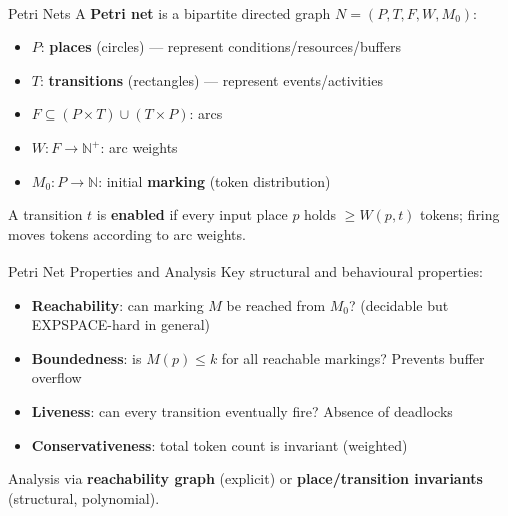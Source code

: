 \begin{v3topic}{Petri Nets}
    A \textbf{Petri net} is a bipartite directed graph $N = (P, T, F, W, M_0)$\textsuperscript{\cite[][pp.~1--30]{reisigUnderstandingPetriNets2013}}:
    \begin{itemize}
        \item $P$: \textbf{places} (circles) — represent conditions/resources/buffers
        \item $T$: \textbf{transitions} (rectangles) — represent events/activities
        \item $F \subseteq (P \times T) \cup (T \times P)$: arcs
        \item $W: F \to \mathbb{N}^+$: arc weights
        \item $M_0: P \to \mathbb{N}$: initial \textbf{marking} (token distribution)
    \end{itemize}
    A transition $t$ is \textbf{enabled} if every input place $p$ holds $\geq W(p,t)$ tokens; firing moves tokens according to arc weights.

\end{v3topic}
\begin{v3topic}{Petri Net Properties and Analysis}
    Key structural and behavioural properties\textsuperscript{\cite[][pp.~40--80]{reisigUnderstandingPetriNets2013}}:
    \begin{itemize}
        \item \textbf{Reachability}: can marking $M$ be reached from $M_0$? (decidable but EXPSPACE-hard in general)
        \item \textbf{Boundedness}: is $M(p) \leq k$ for all reachable markings? Prevents buffer overflow
        \item \textbf{Liveness}: can every transition eventually fire? Absence of deadlocks
        \item \textbf{Conservativeness}: total token count is invariant (weighted)
    \end{itemize}
    Analysis via \textbf{reachability graph} (explicit) or \textbf{place/transition invariants} (structural, polynomial).

\end{v3topic}
